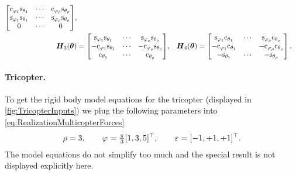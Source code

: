 \begin{subequations}
\begin{align}
\begin{bmatrix}
  \cArmAngle[1] \sPropTilt[1] & \cdots & \cArmAngle[\numProp] \sPropTilt[\numProp] \\
  \sArmAngle[1] \sPropTilt[1] & \cdots & \sArmAngle[\numProp] \sPropTilt[\numProp] \\
  0 & \cdots & 0
 \end{bmatrix}\!,
\\
 \mat{H}_3(\tuple{\PropTilt}) &= \begin{bmatrix}
   \sArmAngle[1] \sPropTilt[1] & \cdots &  \sArmAngle[\numProp] \sPropTilt[\numProp] \\
  -\cArmAngle[1] \sPropTilt[1] & \cdots & -\cArmAngle[\numProp] \sPropTilt[\numProp] \\
   \cPropTilt[1]               & \cdots &  \cPropTilt[\numProp]                     
 \end{bmatrix}\!,&
 \mat{H}_4(\tuple{\PropTilt}) &= \begin{bmatrix}
  \sArmAngle[1] \cPropTilt[1] & \cdots & \sArmAngle[\numProp] \cPropTilt[\numProp] \\
  -\cArmAngle[1] \cPropTilt[1] & & -\cArmAngle[\numProp] \cPropTilt[\numProp] \\
  -\sPropTilt[1] & \cdots & -\sPropTilt[\numProp]
 \end{bmatrix}
.
\end{align}
\end{subequations}

\paragraph{Tricopter.}
To get the rigid body model equations for the tricopter (displayed in \autoref{fig:TricopterInputs}) we plug the following parameters into \eqref{eq:RealizationMulticopterForces}
\begin{align}
 \numProp = 3,
\qquad
 \ArmAngle = \tfrac{\pi}{3} [1, 3, 5]^\top,
\qquad
 \PropDir = [-1, +1, +1]^\top.
\end{align}
The model equations do not simplify too much and the special result is not displayed explicitly here.

